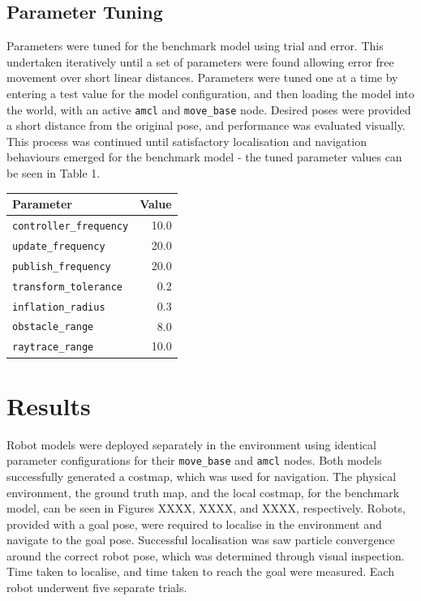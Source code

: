 \documentclass[a4paper]{article}
\begin{document}
\subsection{Parameter Tuning}
\begin{minipage}{0.55\textwidth}
Parameters were tuned for the benchmark model using trial and error. This undertaken iteratively until a set of parameters were found allowing error free movement over short linear distances. Parameters were tuned one at a time by entering a test value for the model configuration, and then loading the model into the world, with an active \texttt{amcl} and \texttt{move\_base} node. Desired poses were provided a short distance from the original pose, and performance was evaluated visually. This process was continued until satisfactory localisation and navigation behaviours emerged for the benchmark model - the tuned parameter values can be seen in Table 1.
\end{minipage}
\hspace{0.75cm}
\begin{minipage}{0.35\textwidth}
\centering
{}
\begin{tabular}{lr}
\toprule
\textbf{Parameter} & \textbf{Value}\\
\midrule
\texttt{controller\_frequency} & 10.0 \\
\texttt{update\_frequency} & 20.0 \\
\texttt{publish\_frequency} & 20.0 \\
\texttt{transform\_tolerance} & 0.2 \\
\texttt{inflation\_radius} & 0.3 \\
\texttt{obstacle\_range} & 8.0\\
\texttt{raytrace\_range} & 10.0\\
\bottomrule
\end{tabular}
\end{minipage}



\section{Results}
Robot models were deployed separately in the environment using identical parameter configurations for their \texttt{move\_base} and \texttt{amcl} nodes. Both models successfully generated a costmap, which was used for navigation. The physical environment, the ground truth map, and the local costmap, for the benchmark model, can be seen in Figures XXXX, XXXX, and XXXX, respectively. Robots, provided with a goal pose, were required to localise in the environment and navigate to the goal pose. Successful localisation was saw particle convergence around the correct robot pose, which was determined through visual inspection. Time taken to localise, and time taken to reach the goal were measured. Each robot underwent five separate trials.\\
\end{document}
